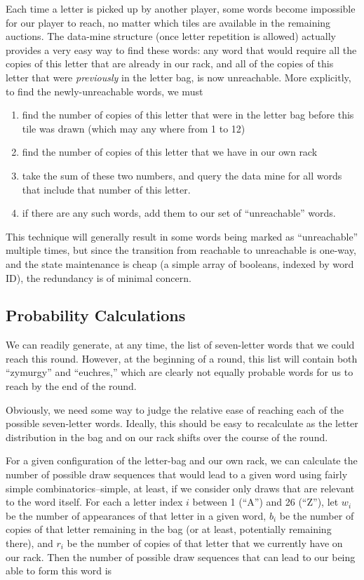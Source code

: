 \documentclass[11pt]{article}
\begin{document}
Each time a letter is picked up by another player, some words become impossible for our player to reach, no matter which tiles are available in the remaining auctions.  The data-mine structure (once letter repetition is allowed) actually provides a very easy way to find these words: any word that would require all the copies of this letter that are already in our rack, and all of the copies of this letter that were \textit{previously} in the letter bag, is now unreachable.  More explicitly, to find the newly-unreachable words, we must
\begin{enumerate}
\item find the number of copies of this letter that were in the letter bag before this tile was drawn (which may any where from 1 to 12)
\item find the number of copies of this letter that we have in our own rack
\item take the sum of these two numbers, and query the data mine for all words that include that number of this letter.
\item if there are any such words, add them to our set of ``unreachable'' words.
\end{enumerate}

This technique will generally result in some words being marked as ``unreachable'' multiple times, but since the transition from reachable to unreachable is one-way, and the state maintenance is cheap (a simple array of booleans, indexed by word ID), the redundancy is of minimal concern.

\subsection{Probability Calculations} %

We can readily generate, at any time, the list of seven-letter words that we could reach this round.  However, at the beginning of a round, this list will contain both ``zymurgy'' and ``euchres,'' which are clearly not equally probable words for us to reach by the end of the round.

Obviously, we need some way to judge the relative ease of reaching each of the possible seven-letter words.  Ideally, this should be easy to recalculate as the letter distribution in the bag and on our rack shifts over the course of the round.

For a given configuration of the letter-bag and our own rack, we can calculate the number of possible draw sequences that would lead to a given word using fairly simple combinatorics--simple, at least, if we consider only draws that are relevant to the word itself.  For each a letter index $i$ between 1 (``A'') and 26 (``Z''), let $w_{i}$ be the number of appearances of that letter in a given word, $b_{i}$ be the number of copies of that letter remaining in the bag (or at least, potentially remaining there), and $r_{i}$ be the number of copies of that letter that we currently have on our rack.  Then the number of possible draw sequences that can lead to our being able to form this word is
\end{document}
